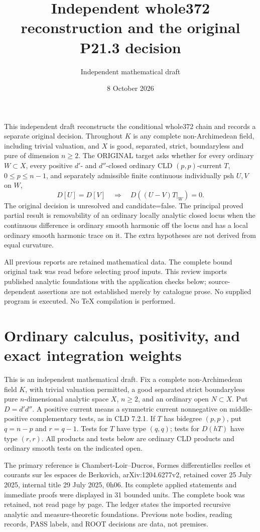 \documentclass[11pt]{article}
\title{Independent whole372 reconstruction and the original P21.3 decision}
\author{Independent mathematical draft}
\date{8 October 2026}
\begin{document}
\maketitle
This independent draft reconstructs the conditional whole372 chain and records a separate original decision. Throughout \(K\) is any complete non-Archimedean field, including trivial valuation, and \(X\) is good, separated, strict, boundaryless and pure of dimension \(n\geq2\). The ORIGINAL target asks whether for every ordinary \(W\subset X\), every positive \(d'\)- and \(d''\)-closed ordinary CLD \((p,p)\)-current \(T\), \(0\leq p\leq n-1\), and separately admissible finite continuous individually psh \(U,V\) on \(W\),
\[
 D[U]=D[V]\quad\Longrightarrow\quad D((U-V)T|_W)=0.
\]
The original decision is unresolved and candidate=false. The principal proved partial result is removability of an ordinary locally analytic closed locus when the continuous difference is ordinary smooth harmonic off the locus and has a local ordinary smooth harmonic trace on it. The extra hypotheses are not derived from equal curvature.

All previous reports are retained mathematical data. The complete bound original task was read before selecting proof inputs. This review imports published analytic foundations with the application checks below; source-dependent assertions are not established merely by catalogue prose. No supplied program is executed. No TeX compilation is performed.


\section{Ordinary calculus, positivity, and exact integration weights}


This is an independent mathematical draft. Fix a complete non-Archimedean field \(K\), with trivial valuation permitted, a good separated strict boundaryless pure \(n\)-dimensional analytic space \(X\), \(n\geq2\), and an ordinary open \(N\subset X\). Put \(D=d'd''\). A positive current means a symmetric current nonnegative on middle-positive complementary tests, as in CLD 7.2.1. If \(T\) has bidegree \((p,p)\), put \(q=n-p\) and \(r=q-1\). Tests for \(T\) have type \((q,q)\); tests for \(D(hT)\) have type \((r,r)\). All products and tests below are ordinary CLD products and ordinary smooth tests on the indicated open.

The primary reference is Chambert-Loir--Ducros, Formes differentielles reelles et courants sur les espaces de Berkovich, arXiv:1204.6277v2, retained cover 25 July 2025, internal title 29 July 2025, 0h06. Its complete applied statements and immediate proofs were displayed in 31 bounded units. The complete book was retained, not read page by page. The ledger states the imported recursive analytic and measure-theoretic foundations. Previous note bodies, reading records, PASS labels, and ROOT decisions are data, not premises.
\end{document}
